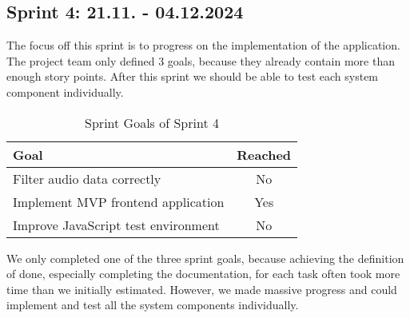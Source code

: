 \subsection{Sprint 4: 21.11. - 04.12.2024}\label{subsec:sprint-4}
The focus off this sprint is to progress on the implementation of the application.
The project team only defined 3 goals, because they already contain more than enough story points.
After this sprint we should be able to test each system component individually.
\begin{table}[H]
    \centering
    \begin{tabularx}{\textwidth}{X c}
        \toprule
        \textbf{Goal}                                         & \textbf{Reached} \\
        \midrule
        Filter audio data correctly                           & No               \\
        \midrule
        Implement MVP frontend application                    & Yes              \\
        \midrule
        Improve JavaScript test environment                   & No               \\
        \bottomrule
    \end{tabularx}
    \caption{Sprint Goals of Sprint 4}\label{tab:sprint_goals4}
\end{table}
We only completed one of the three sprint goals, because achieving the definition of done, especially completing the documentation,
for each task often took more time than we initially estimated.
However, we made massive progress and could implement and test all the system components individually.

